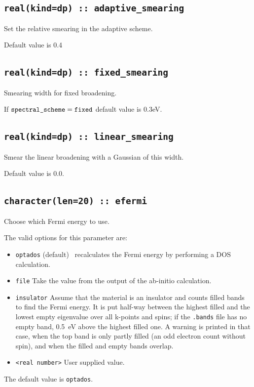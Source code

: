 \documentclass[a4paper,11pt,twoside]{book}
\begin{document}
{\subsection[adaptive\_smearing]{\tt real(kind=dp) :: adaptive\_smearing}
Set the relative smearing in the adaptive scheme.

Default value is 0.4

\subsection[fixed\_smearing]{\tt real(kind=dp) :: fixed\_smearing}
Smearing width for fixed broadening.

If $\verb#spectral_scheme# = \verb#fixed#$ default value is 0.3eV.


\subsection[adaptive\_smearing]{\tt real(kind=dp) :: linear\_smearing}
Smear the linear broadening with a Gaussian of this width.

Default value is 0.0.

\subsection[compute\_efermi]{{\tt character(len=20) :: efermi}}
Choose which Fermi energy to use.

The valid options for this parameter are:
\begin{itemize}
\item[{\bf --}]  \verb#optados# (default) \optados\ recalculates the Fermi energy by performing a DOS calculation.
\item[{\bf --}]  \verb#file# Take the value from the output of the ab-initio calculation.
\item[{\bf --}]  \verb#insulator# Assume that the material is an insulator and counts filled bands to find the Fermi energy. It is put half-way between the highest filled and the lowest empty eigenvalue over all k-points and spins; if the {\tt .bands} file has no empty band, 0.5~eV above the highest filled one. A warning is printed in that case, when the top band is only partly filled (an odd electron count without spin), and when the filled and empty bands overlap.
\item[{\bf --}]  \verb#<real number># User supplied value.
\end{itemize}

The default value is {\tt optados}.


}
\end{document}
